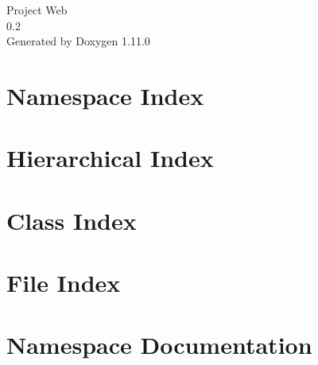 \documentclass[twoside]{book}
\newcommand{\+}{\discretionary{\mbox{\scriptsize$\hookleftarrow$}}{}{}}
\newcommand{\clearemptydoublepage}{%
    \newpage{\pagestyle{empty}\cleardoublepage}%
  }
\begin{document}
  \raggedbottom
    \hypersetup{pageanchor=false,
                bookmarksnumbered=true,
                pdfencoding=unicode
               }
  \begin{titlepage}
  \vspace*{7cm}
  \begin{center}%
  {\Large Project Web}\\
  [1ex]\large 0.\+2 \\
  \vspace*{1cm}
  {\large Generated by Doxygen 1.11.0}\\
  \end{center}
  \end{titlepage}
  \clearemptydoublepage
  \tableofcontents
  \clearemptydoublepage
  \hypersetup{pageanchor=true}









\chapter{Namespace Index}

\chapter{Hierarchical Index}

\chapter{Class Index}

\chapter{File Index}

\chapter{Namespace Documentation}

\end{document}
